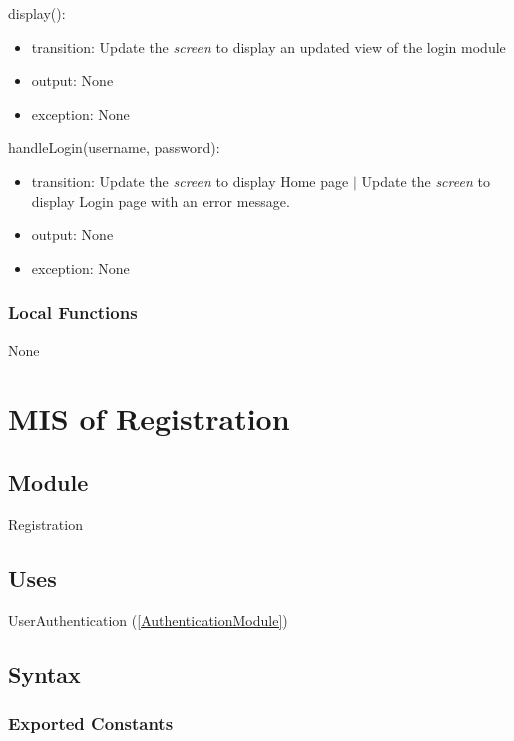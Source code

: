 \documentclass[12pt, titlepage]{article}
\begin{document}
\noindent display():
\begin{itemize}
\item transition: Update the \textit{screen} to display an updated view of the login module
\item output: None
\item exception: None

\end{itemize}

\noindent handleLogin(username, password):
\begin{itemize}
\item transition: Update the \textit{screen} to display Home page $|$ Update the \textit{screen} to display Login page with an error message.
\item output: None
\item exception: None

\end{itemize}

\subsubsection{Local Functions}

None

\newpage

\section{MIS of Registration} \label{RegistrationModule}

\subsection{Module}

Registration

\subsection{Uses}

UserAuthentication (\ref{AuthenticationModule})

\subsection{Syntax}

\subsubsection{Exported Constants}
\end{document}
